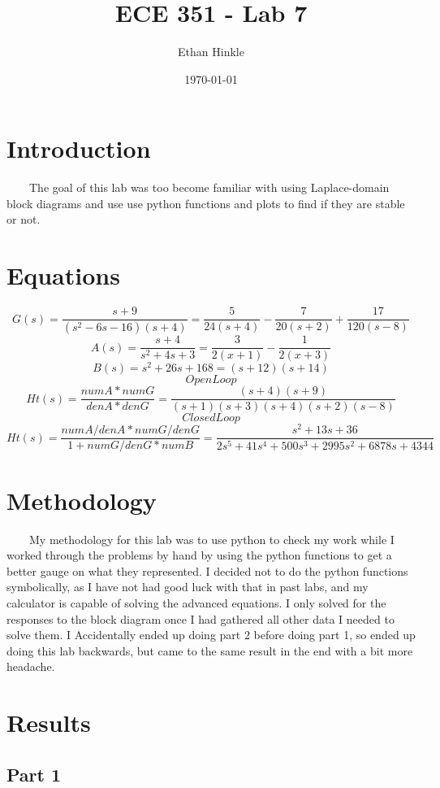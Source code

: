 \documentclass[11pt,a4]{article}
\title{ECE 351 - Lab 7}
\author{Ethan Hinkle}
\date{\today}
\begin{document}
\maketitle

\section{Introduction}
\ \ \ \ The goal of this lab was too become familiar with using Laplace-domain block diagrams and use use python functions and plots to find if they are stable or not.

\section{Equations}

$$G(s) = \frac{s+9}{(s^2-6s-16)(s+4)} = \frac{5}{24(s+4)} - \frac{7}{20(s+2)} + \frac{17}{120(s-8)}$$
$$A(s) = \frac{s+4}{s^2+4s+3} = \frac{3}{2(x+1)} - \frac{1}{2(x+3)}$$
$$B(s) = s^2+26s+168 = (s+12)(s+14)$$
$$Open Loop$$
$$Ht(s) = \frac{numA*numG}{denA*denG} = \frac{(s+4)(s+9)}{(s+1)(s+3)(s+4)(s+2)(s-8)}$$
$$Closed Loop$$
$$Ht(s) = \frac{numA/denA*numG/denG}{1+numG/denG*numB} = \frac{s^2+13s+36}{2s^5+41s^4+500s^3+2995s^2+6878s+4344}$$

\section{Methodology}
\ \ \ \ My methodology for this lab was to use python to check my work while I worked through the problems by hand by using the python functions to get a better gauge on what they represented. I decided not to do the python functions symbolically, as I have not had good luck with that in past labs, and my calculator is capable of solving the advanced equations. I only solved for the responses to the block diagram once I had gathered all other data I needed to solve them. I Accidentally ended up doing part 2 before doing part 1, so ended up doing this lab backwards, but came to the same result in the end with a bit more headache.

\section{Results}

\subsection{Part 1}
\end{document}
